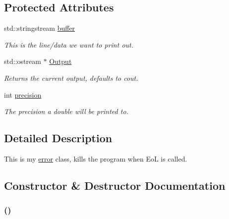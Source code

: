 \subsection*{Protected Attributes}
\begin{DoxyCompactItemize}
\item 
std::stringstream \hyperlink{classJKBuilder_1_1IOManager_adbf6a7492c6521b38c1510aebe307770}{buffer}
\begin{DoxyCompactList}\small\item\em This is the line/data we want to print out. \item\end{DoxyCompactList}\item 
std::ostream $\ast$ \hyperlink{classJKBuilder_1_1IOManager_aafe3b1218427d92a689d147f74e74f4b}{Output}
\begin{DoxyCompactList}\small\item\em Returns the current output, defaults to cout. \item\end{DoxyCompactList}\item 
int \hyperlink{classJKBuilder_1_1IOManager_aa95455ed52a8459fad69509a4a0411b5}{precision}
\begin{DoxyCompactList}\small\item\em The precision a double will be printed to. \item\end{DoxyCompactList}\end{DoxyCompactItemize}


\subsection{Detailed Description}
This is my \hyperlink{classJKBuilder_1_1error}{error} class, kills the program when EoL is called. 

\subsection{Constructor \& Destructor Documentation}
\hypertarget{classJKBuilder_1_1error_a43b8d30b879d4f09ceb059b02af2bc02}{
\subsubsection[{error}]{ ()}}
\label{classJKBuilder_1_1error_a43b8d30b879d4f09ceb059b02af2bc02}


